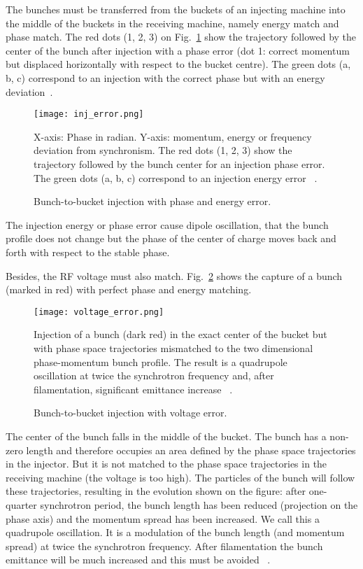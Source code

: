 The bunches must be transferred from the buckets of an injecting machine into the middle of the buckets in the receiving machine, namely energy match and phase match. The red dots (1, 2, 3) on Fig.~\ref{inj_error} show the trajectory followed by the center of the bunch after injection with a phase error (dot 1: correct momentum but displaced horizontally with respect to the bucket centre). The green dots (a, b, c) correspond to an injection with the correct phase but with an energy deviation~\cite{baudrenghien_low-level_2010}. 
\begin{figure}[!htb]
   \centering   
   \texttt{[image: inj\_error.png]}
   \caption{Bunch-to-bucket injection with phase and energy error.}{X-axis: Phase in radian. Y-axis: momentum, energy or frequency deviation
from synchronism. The red dots (1, 2, 3) show the trajectory followed by the bunch center for an injection phase error. The green dots (a, b, c) correspond to an injection energy error ~\cite{baudrenghien_low-level_2010}.}
   \label{inj_error}
\end{figure}

The injection energy or phase error cause dipole oscillation, that the bunch profile does not change but the phase of the center of charge moves back and forth with respect to the stable phase. 

Besides, the RF voltage must also match. Fig.~\ref{voltage_error} shows the capture of a bunch (marked in red) with perfect phase and energy matching. 
\begin{figure}[!htb]
   \centering   
   \texttt{[image: voltage\_error.png]}
   \caption{Bunch-to-bucket injection with voltage error.}{Injection of a bunch (dark red) in the exact center of the bucket but with phase space trajectories mismatched to the two dimensional phase-momentum bunch profile. The result is a quadrupole oscillation at twice the synchrotron frequency and, after filamentation, significant emittance increase ~\cite{baudrenghien_low-level_2010}.}
   \label{voltage_error}
\end{figure}

The center of the bunch falls in the middle of the bucket. The bunch has a non-zero length and therefore occupies an area defined by the
phase space trajectories in the injector. But it is not matched to the phase space trajectories in the receiving machine (the voltage is too high). The particles of the bunch will follow these trajectories, resulting in the evolution shown on the figure: after one-quarter synchrotron period, the bunch length has been reduced (projection on the phase axis) and the momentum spread has been increased. We call
this a quadrupole oscillation. It is a modulation of the bunch length (and momentum spread) at twice the synchrotron frequency. After filamentation the bunch emittance will be much increased and this must be avoided ~\cite{baudrenghien_low-level_2010}.


